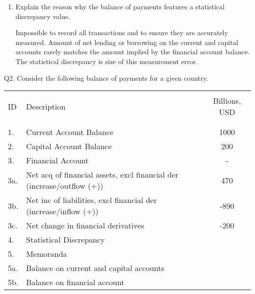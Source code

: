 \documentclass[12pt]{article}
\begin{document}
\begin{enumerate}[1)]
	\item Explain the reason why the balance of payments features a statistical discrepancy value.
	
	\vspace{0.2in}
	Impossible to record all transactions and to ensure they are accurately
	measured.
	Amount of net lending or borrowing on the current and capital accounts
	rarely matches the amount implied by the financial account balance.
	The statistical discrepancy is size of this measurement error.
	\vspace{0.2in}
	
\end{enumerate}

\newpage

\noindent Q2. Consider the following balance of payments for a given country.

\begin{table}[!h]
	\centering
	\begin{tabular}[t]{l l c }
		\hline
		&&\\
		ID & Description & Billions, USD \\
		&&\\
		\hline
		&&\\
		1. & Current Account Balance & 1000\\
		2. & Capital Account Balance & 200\\
		3. & Financial Account	& -\\
		3a. & Net acq of financial assets, excl financial der (increase/outflow (+))& 470\\
		3b. & Net inc of liabilities, excl financial der (increase/inflow (+))	& -890 \\
		3c. & Net change in financial derivatives & -200\\
		4. & Statistical Discrepancy & \\
		5. & Memoranda & \\
		5a. & Balance on current and capital accounts & \\
		5b. & Balance on financial account & \\
		\hline
	\end{tabular}
\end{table}
\end{document}
